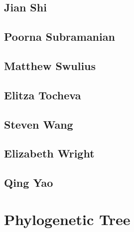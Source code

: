 \documentclass[]{tufte-book}
\begin{document}
\hypertarget{jian_shi}{\section*{Jian Shi}\label{jian_shi}}

\hypertarget{poorna_subramanian}{\section*{Poorna
Subramanian}\label{poorna_subramanian}}

\hypertarget{matthew_swulius}{\section*{Matthew
Swulius}\label{matthew_swulius}}

\hypertarget{elitza_tocheva}{\section*{Elitza
Tocheva}\label{elitza_tocheva}}

\hypertarget{steven_wang}{\section*{Steven Wang}\label{steven_wang}}

\hypertarget{elizabeth_wright}{\section*{Elizabeth
Wright}\label{elizabeth_wright}}

\hypertarget{qing_yao}{\section*{Qing Yao}\label{qing_yao}}

\hypertarget{tree}{\chapter{Phylogenetic Tree}\label{tree}}
\end{document}
